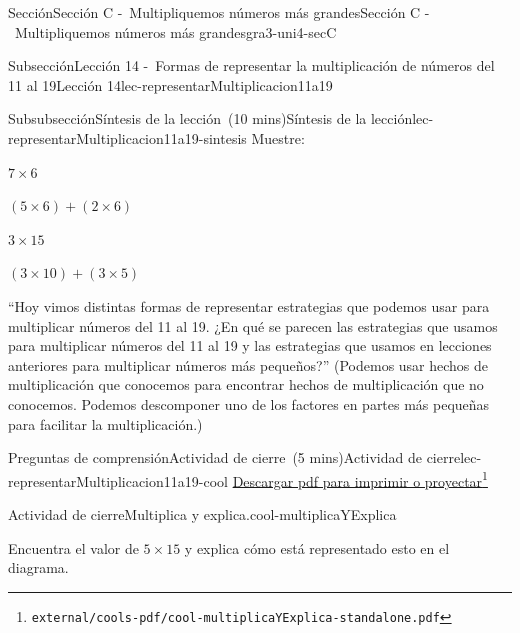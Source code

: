 \documentclass[oneside,10pt,]{article}
\begin{document}
\begin{sectionptx}{Sección}{Sección C -~Multipliquemos números más grandes}{}{Sección C -~Multipliquemos números más grandes}{}{}{gra3-uni4-secC}
\begin{subsectionptx}{Subsección}{Lección 14 -~Formas de representar la multiplicación de números del 11 al 19}{}{Lección 14}{}{}{lec-representarMultiplicacion11a19}
\typeout{************************************************}
%
\begin{subsubsectionptx}{Subsubsección}{Síntesis de la lección~(10 mins)}{}{Síntesis de la lección}{}{}{lec-representarMultiplicacion11a19-sintesis}
Muestre:%
\par
\(7 \times 6\)%
\par
\((5 \times 6) + (2 \times 6)\)%
\par
\(3 \times 15\)%
\par
\((3 \times 10) + (3 \times 5)\)%
\par
``Hoy vimos distintas formas de representar estrategias que podemos usar para multiplicar números del 11 al 19. ¿En qué se parecen las estrategias que usamos para multiplicar números del 11 al 19 y las estrategias que usamos en lecciones anteriores para multiplicar números más pequeños?'' (Podemos usar hechos de multiplicación que conocemos para encontrar hechos de multiplicación que no conocemos. Podemos descomponer uno de los factores en partes más pequeñas para facilitar la multiplicación.)%
\end{subsubsectionptx}
%
%
\typeout{************************************************}
\typeout{************************************************}
%
\begin{reading-questions-subsubsection}{Preguntas de comprensión}{Actividad de cierre~(5 mins)}{}{Actividad de cierre}{}{}{lec-representarMultiplicacion11a19-cool}
\href{external/cools-pdf/cool-multiplicaYExplica-standalone.pdf}{Descargar pdf para imprimir o proyectar}\footnote{\nolinkurl{external/cools-pdf/cool-multiplicaYExplica-standalone.pdf}\label{lec-representarMultiplicacion11a19-cool-5}}\begin{project}{Actividad de cierre}{Multiplica y explica.}{cool-multiplicaYExplica}%
\begin{sidebyside}{2}{0}{0}{0}%
\begin{sbspanel}{0.6}%
Encuentra el valor de \(5\times 15\) y explica cómo está representado esto en el diagrama.%
\end{sbspanel}%
\begin{sbspanel}{0.4}%

\end{sbspanel}
\end{sidebyside}
\end{project}
\end{reading-questions-subsubsection}
\end{subsectionptx}
\end{sectionptx}
\end{document}
